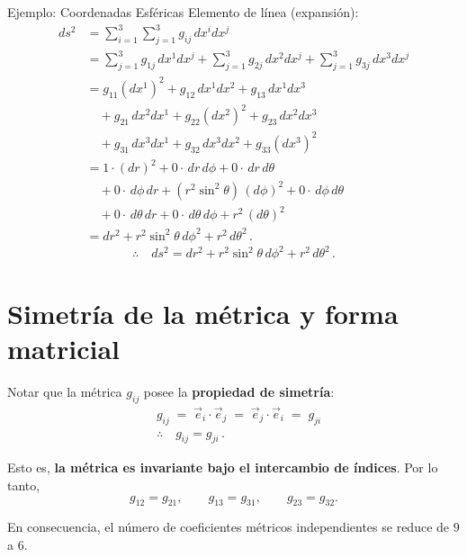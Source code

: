 \documentclass[../apunte_mecanica_clasica.tex]{subfiles}%
\begin{document}
\begin{apuntebloque}{Ejemplo: Coordenadas Esféricas}
Elemento de línea (expansión):
\begin{align*}
    ds^2
      &= \sum_{i=1}^3\sum_{j=1}^3 g_{ij}\,dx^i dx^j \\[2pt]
      &= \sum_{j=1}^3 g_{1j}\,dx^1 dx^j
       + \sum_{j=1}^3 g_{2j}\,dx^2 dx^j
       + \sum_{j=1}^3 g_{3j}\,dx^3 dx^j \\[2pt]
      &= g_{11}(dx^1)^2 + g_{12}\,dx^1 dx^2 + g_{13}\,dx^1 dx^3 \\
      &\quad + g_{21}\,dx^2 dx^1 + g_{22}(dx^2)^2 + g_{23}\,dx^2 dx^3 \\
      &\quad + g_{31}\,dx^3 dx^1 + g_{32}\,dx^3 dx^2 + g_{33}(dx^3)^2 \\[4pt]
      &= 1\cdot(dr)^2 + 0\cdot\,dr\,d\phi + 0\cdot\,dr\,d\theta \\
      &\quad + 0\cdot\,d\phi\,dr + (r^2\sin^2\theta)\,(d\phi)^2 + 0\cdot\,d\phi\,d\theta \\
      &\quad + 0\cdot\,d\theta\,dr + 0\cdot\,d\theta\,d\phi + r^2\,(d\theta)^2 \\[4pt]
      &= dr^2 + r^2\sin^2\theta\,d\phi^2 + r^2\,d\theta^2 \,.
\end{align*}
\begin{equation*}
    \therefore \quad ds^2=dr^2 + r^2\sin^2\theta\,d\phi^2 + r^2\,d\theta^2 \,.
\end{equation*}

\end{apuntebloque}

\newpage

\section{Simetría de la métrica y forma matricial}

Notar que la métrica $g_{ij}$ posee la \textbf{propiedad de simetría}:
\begin{align*}
    &g_{ij} \;=\; \vec{e}_i \cdot \vec{e}_j \;=\; \vec{e}_j \cdot \vec{e}_i \;=\; g_{ji} \\[4pt]
    &\therefore \quad g_{ij} = g_{ji} \,.
\end{align*}

Esto es, \textbf{la métrica es invariante bajo el intercambio de índices}. Por lo tanto,
\begin{equation*}
    g_{12} = g_{21}, \qquad
    g_{13} = g_{31}, \qquad
    g_{23} = g_{32}.
\end{equation*}

En consecuencia, el número de coeficientes métricos independientes se reduce de $9$ a $6$.
\end{document}
